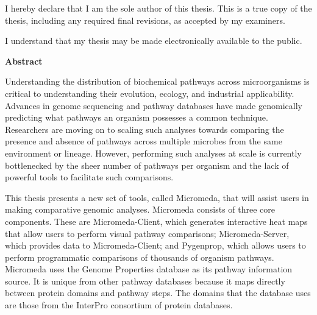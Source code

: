 \cleardoublepage %

  \noindent
I hereby declare that I am the sole author of this thesis. This is a true copy of the thesis, including any required final revisions, as accepted by my examiners.

  \bigskip
  
  \noindent
I understand that my thesis may be made electronically available to the public.

\cleardoublepage


\begin{center}\textbf{Abstract}\end{center}

Understanding the distribution of biochemical pathways across microorganisms is 
critical to understanding their evolution, ecology, and industrial 
applicability. Advances in genome sequencing and pathway databases have made 
genomically predicting what pathways an organism possesses a common technique. 
Researchers are moving on to scaling such analyses towards comparing the 
presence and absence of pathways across multiple microbes from the same 
environment or lineage. However, performing such analyses at scale is currently 
bottlenecked by the sheer number of pathways per organism and the lack of 
powerful tools to facilitate such comparisons. 

This thesis presents a new set of tools, called Micromeda, that will assist 
users in making comparative genomic analyses. Micromeda consists of three core 
components. These are Micromeda-Client, which generates interactive heat maps 
that allow users to perform visual pathway comparisons; Micromeda-Server, which 
provides data to Micromeda-Client; and Pygenprop, which allows users to perform 
programmatic comparisons of thousands of organism pathways. Micromeda uses the 
Genome Properties database as its pathway information source. It is unique from 
other pathway databases because it maps directly between protein domains and 
pathway steps. The domains that the database uses are those from the InterPro 
consortium of protein databases. 

